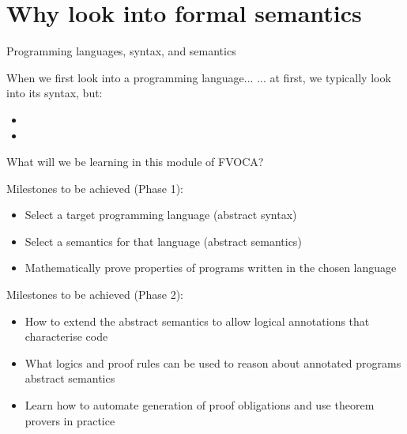 \documentclass[aspectratio=169]{beamer}
\begin{document}
\frame[plain]{\titlepage}


\section{Why look into formal semantics}

\newcommand{\kw}[1]{\structure{\text{#1}}}

\begin{slide}{Programming languages, syntax, and semantics}
  \begin{block}{When we first look into a programming language...}
  ... at first, we typically look into its syntax, but:
  \begin{itemize}
    \item 
    \item 
  \end{itemize}
    
  \end{block}
\end{slide}

\begin{slide}{What will we be learning in this module of FVOCA?}
\begin{block}{Milestones to be achieved (Phase 1):}
\begin{itemize}
  \item Select a target programming language (abstract syntax)
  \item Select a semantics for that language (abstract semantics)
  \item Mathematically prove properties of programs written in the chosen language
\end{itemize}
\end{block}

\begin{block}{Milestones to be achieved (Phase 2):}
\begin{itemize}
  \item How to extend the abstract semantics to allow logical annotations that characterise code
  \item What logics and proof rules can be used to reason about annotated programs abstract semantics
  \item Learn how to automate generation of proof obligations and use theorem provers in practice 
\end{itemize}
\end{block}

  
\end{slide}
\end{document}
